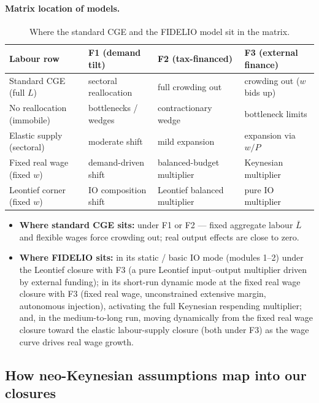 \paragraph{Matrix location of models.}
\begin{table}[htbp]
\centering
\small
\begin{tabular}{l l l l}
\toprule
Labour row & F1 (demand tilt) & F2 (tax-financed) & F3 (external finance) \\
\midrule
Standard CGE (full $L$)   & sectoral reallocation & full crowding out & crowding out ($w$ bids up) \\
No reallocation (immobile)& bottlenecks / wedges  & contractionary wedge & bottleneck limits \\
Elastic supply (sectoral) & moderate shift        & mild expansion & expansion via $w/P$ \\
Fixed real wage (fixed $w$)& demand-driven shift   & balanced-budget multiplier & Keynesian multiplier \\
Leontief corner (fixed $w$)& IO composition shift  & Leontief balanced multiplier & pure IO multiplier \\
\bottomrule
\end{tabular}
\caption{Where the standard CGE and the FIDELIO model sit in the matrix.}
\label{tab:matrix-map}
\end{table}

\begin{itemize}
\item \textbf{Where standard CGE sits:} under F1 or F2 --- fixed
  aggregate labour $\bar L$ and flexible wages force crowding out; real output
  effects are close to zero.
\item \textbf{Where FIDELIO sits:} in its static / basic IO mode (modules
  1--2) under the Leontief closure with F3 (a pure Leontief input--output
  multiplier driven by
  external funding); in its short-run dynamic mode at the fixed real wage
  closure with F3 (fixed real
  wage, unconstrained extensive margin, autonomous injection), activating the
  full Keynesian respending multiplier; and, in the medium-to-long run, moving
  dynamically from the fixed real wage closure toward the elastic
  labour-supply closure (both under F3) as the wage curve drives real wage
  growth.
\end{itemize}

\subsection{How neo-Keynesian assumptions map into our closures}\label{app:neokeynesian}

